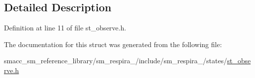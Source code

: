 \subsection{Detailed Description}


Definition at line 11 of file st\+\_\+observe.\+h.



The documentation for this struct was generated from the following file\+:\begin{DoxyCompactItemize}
\item 
smacc\+\_\+sm\+\_\+reference\+\_\+library/sm\+\_\+respira\+\_/include/sm\+\_\+respira\+\_/states/\hyperlink{sm__respira__1_2include_2sm__respira__1_2states_2st__observe_8h}{st\+\_\+observe.\+h}\end{DoxyCompactItemize}
